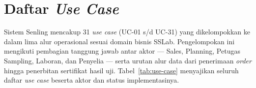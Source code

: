 \section{Daftar \textit{Use Case}}

Sistem Senling mencakup 31 \textit{use case} (UC-01 s/d UC-31) yang dikelompokkan ke dalam lima alur operasional sesuai domain bisnis SSLab. Pengelompokan ini mengikuti pembagian tanggung jawab antar aktor — Sales, Planning, Petugas Sampling, Laboran, dan Penyelia — serta urutan alur data dari penerimaan \textit{order} hingga penerbitan sertifikat hasil uji. Tabel~\ref{tab:use-case} menyajikan seluruh daftar \textit{use case} beserta aktor dan status implementasinya.

